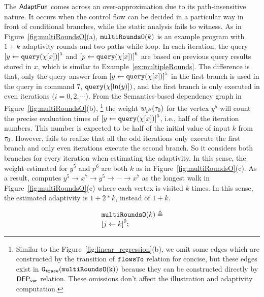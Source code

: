 \begin{example}
\label{ex:multiRoundsO}
The $\textsf{AdaptFun}$ comes across an over-approximation due to its path-insensitive nature. 
It occurs when the control flow can be decided in a particular way in front of conditional branches,
while the static analysis fails to witness. 
As in Figure~\ref{fig:multiRoundsO}(a), $\mathtt{multiRoundsO}(k)$
is an example program with $1 + k$ adaptivity rounds and two paths while loop.
In each iteration, the query $\clabel{\assign{y}{\query(\chi[x])}}^{5}$
and $\clabel{\assign{p}{\query(\chi[x])}}^{6}$ are based on previous query results stored in $x$,
which is similar to Example~\ref{ex:multipleRounds}.
The difference is that, only the query answer from $\clabel{\assign{y}{\query(\chi[x])}}^{5}$ in the first branch
is used in the query in command $7$, ${\tt query}(\chi[\ln(y)])$,
and the first branch is only executed in even iterations ($i = 0, 2, \cdots $).
From the Semantics-based dependency graph in Figure~\ref{fig:multiRoundsO}(b),
\footnote{Similar to the Figure~\ref{fig:linear_regression}(b), we omit some edges which are constructed by the transition of $\mathtt{flowsTo}$ relation
for concise, but these edges exist
in $\mathtt{{G_{trace}}}(\mathtt{multiRoundsO(k)})$ because they can be constructed directly by $\mathsf{DEP_{var}}$ relation.
These omissions don't affect the illustration and adaptivity computation.} 
the weight $w_{y^5}(\mathtt{\tau}_0)$ for the vertex $y^5$ will count the precise
evaluation times of $\clabel{\assign{y}{\query(\chi[x])}}^{5}$, i.e., half of the iteration numbers.
This number is expected to be half of the initial value of input $k$ from $\mathtt{\tau}_0$.
However, {\THESYSTEM} fails to realize that all the odd iterations only execute the first branch
and only even iterations execute the second branch. 
So it considers both branches for every iteration when estimating the adaptivity. 
In this sense, the weight estimated for $y^5$ and $p^6$ are both 
$k$ as in Figure~\ref{fig:multiRoundsO}(c).
As a result, {\THESYSTEM} computes $y^5  \to x^7  \to y^5  \to \cdots \to x^7 $
as the longest walk in Figure~\ref{fig:multiRoundsO}(c)
where each vertex is visited $k$ times.
In this sense, the estimated adaptivity is $1 + 2 * k$, instead of $1 + k$. 
%
{ \small
\begin{figure}
\centering
    \begin{subfigure}{1.0\textwidth}
\centering
\small{
    \[
    \begin{array}{l}
        \kw{multiRoundsO}(k) \triangleq \\
        \clabel{ \assign{j}{k}}^{0} ; 

\end{array}\]}
\end{subfigure}
\end{figure}}
\end{example}
